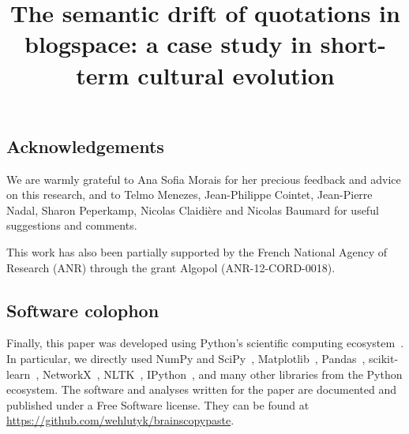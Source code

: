 \documentclass[man]{apa6}
\title{The semantic drift of quotations in blogspace: a case study in short-term cultural evolution}
\date{}
\newcommand{\tg}[1]{{#1}}
\newcommand{\newtext}[1]{\tg{#1}}
\newenvironment{new}{\par}{\par}
\begin{document}
\maketitle

\setcounter{secnumdepth}{3}







\subsection*{Acknowledgements}

We are warmly grateful to Ana Sofia Morais for her precious feedback and advice on this research, and to Telmo Menezes, Jean-Philippe Cointet, Jean-Pierre Nadal, Sharon Peperkamp, \newtext{Nicolas Claidière} and Nicolas Baumard for useful suggestions and comments.

{\new This work has also been partially supported by the French National Agency of Research (ANR) through the grant Algopol (ANR-12-CORD-0018).}

\begin{new}

\subsection*{Software colophon}

Finally, this paper was developed using Python's scientific computing ecosystem~\citep{millman_python_2011}.
In particular, we directly used NumPy and SciPy~\citep{walt_numpy_2011}, Matplotlib~\citep{hunter_matplotlib:_2007}, Pandas~\citep{mckinney_data_2010}, scikit-learn~\citep{pedregosa_scikit-learn:_2011}, NetworkX~\citep{hagberg_exploring_2008}, NLTK~\citep{bird_nltk_2009}, IPython~\citep{perez_ipython:_2007}, and many other libraries from the Python ecosystem.
The software and analyses written for the paper are documented and published under a Free Software license.
They can be found at \url{https://github.com/wehlutyk/brainscopypaste}.

\end{new}

\setcounter{secnumdepth}{0}



\end{document}
